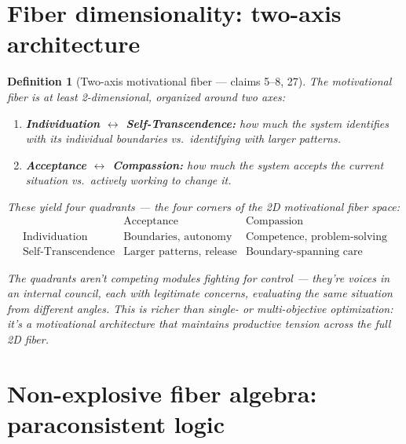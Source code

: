 \documentclass[11pt,a4paper]{article}
\newtheorem{definition}{Definition}[section]
\begin{document}
\section{Fiber dimensionality: two-axis architecture}
\label{sec:axes}

\begin{definition}[Two-axis motivational fiber --- claims 5--8, 27]
\label{def:axes}
The motivational fiber is at least 2-dimensional, organized around two
axes:
\begin{enumerate}
\item \textbf{Individuation $\leftrightarrow$ Self-Transcendence:}
  how much the system identifies with its individual boundaries vs.\
  identifying with larger patterns.
\item \textbf{Acceptance $\leftrightarrow$ Compassion:}
  how much the system accepts the current situation vs.\ actively
  working to change it.
\end{enumerate}

These yield four quadrants --- the four corners of the 2D motivational
fiber space:
\[
  \begin{array}{c|c|c}
    & \text{Acceptance} & \text{Compassion} \\ \hline
    \text{Individuation} & \text{Boundaries, autonomy}
    & \text{Competence, problem-solving} \\ \hline
    \text{Self-Transcendence} & \text{Larger patterns, release}
    & \text{Boundary-spanning care}
  \end{array}
\]

The quadrants aren't competing modules fighting for control --- they're
voices in an internal council, each with legitimate concerns, evaluating
the same situation from different angles. This is richer than single- or
multi-objective optimization: it's a motivational architecture that
maintains productive tension across the full 2D fiber.
\end{definition}

\section{Non-explosive fiber algebra: paraconsistent logic}
\label{sec:paraconsistent}
\end{document}
